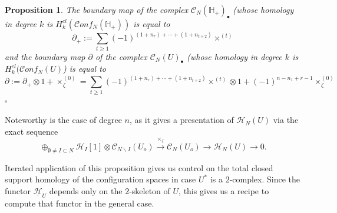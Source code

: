 \documentclass[12pt,letterpaper]{amsart}
\numberwithin{equation}{section}
\def\HH{{\mathbb H}}
\def\ssm{\smallsetminus}
\newcommand{\p}{\partial}
\def\Hcal{{\mathcal H}}
\def\uHcal{{\underline\Hcal}}
\def\Cscr{{\mathscr C}}
\def\pt{{\scriptscriptstyle\bullet}}
\newcommand\conf{\mathscr{C}\!\mathit{onf}\!}
\newtheorem{proposition}[theorem]{Proposition}
\theoremstyle{remark}
\begin{document}
\begin{proposition}\label{prop:barcomplex}
The boundary map of the complex $\Cscr_N(\HH_+)_\pt$ (whose homology in degree $k$ is 
$H^{cl}_k(\conf_N(\HH_+))$ is equal to 
\[
\textstyle \p_+:= \sum_{t\ge 1} (-1)^{(1+n_r)+\cdots +(1+n_{t+2})}\times^{(t)}
\]
and the  boundary map  $\p$ of the complex $\Cscr_N(U)_\pt$ (whose homology in degree $k$ is $H^{cl}_k(\conf_N(U)$) is equal to 
\[
\textstyle \p:= \p_+\otimes 1+\times^{(0)}_{\zeta}=\sum_{t\ge 1}  (-1)^{(1+n_r)+\cdots +(1+n_{t+2})}\times^{(t)}\otimes 1+(-1)^{n-n_1+r-1}\times^{(0)}_{\zeta}
\]
\hfill $\square$
\end{proposition}

Noteworthy is the case  of degree $n$, as it gives  a presentation of $\Hcal_N(U)$ via the exact sequence
\begin{equation}\label{eqn:degree_n_pres}
\oplus_{\emptyset\not=I\subset N}\Hcal_I[1]\otimes \Cscr_{N\ssm I}(U_o)\xrightarrow{\times_\zeta} \Cscr_{N}(U_o)\to \Hcal_N(U)\to 0.
\end{equation}

Iterated application of this proposition gives us control on the total closed support  homology of the configuration spaces in case $U^*$ is a $2$-complex. Since  the functor $\uHcal_U$ depends only on  the $2$-skeleton of $U$, this gives us a recipe to compute that functor in the general case.
\end{document}
